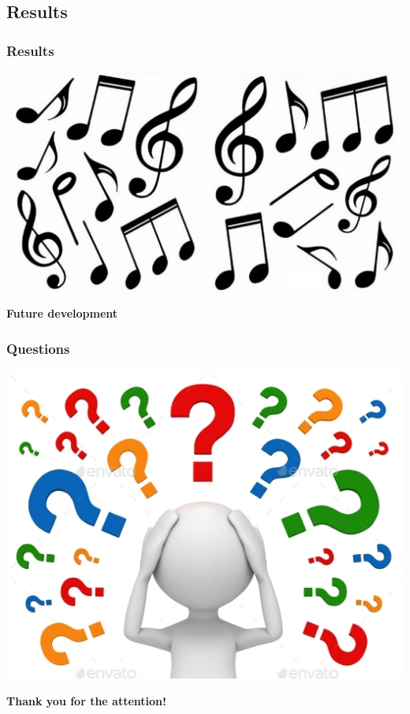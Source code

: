 \documentclass[12pt]{beamer}
\begin{document}
            \subsection{Results}
            \begin{frame}
                \frametitle{Results}
                \includegraphics[scale=0.3]{notes}
            \end{frame}
            \begin{frame}
                \begin{center}
                    {\LARGE \textbf{Future development}}
                \end{center}
            \end{frame}
            \begin{frame}
                \frametitle{Questions}
                \begin{center}
                    \includegraphics[scale=0.5]{questions}
                \end{center}
            \end{frame}
            \begin{frame}
                \begin{center}
                    {\LARGE \textbf{Thank you for the attention!}}
                \end{center}
            \end{frame}
\end{document}
